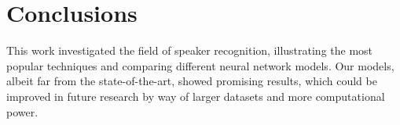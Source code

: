 \documentclass[conference]{IEEEtran}
\begin{document}

\section{Conclusions}
\label{sec:conclusions}

This work investigated the field of speaker recognition, illustrating the most popular techniques and comparing different neural network models. Our models, albeit far from the state-of-the-art, showed promising results, which could be improved in future research by way of larger datasets and more computational power.



\end{document}
